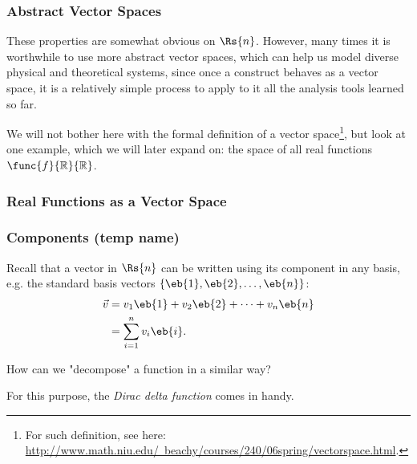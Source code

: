 \begin{frame}
	\frametitle{Abstract Vector Spaces}
	These properties are somewhat obvious on $\Rs{n}$. However, many times it is worthwhile to use more abstract vector spaces, which can help us model diverse physical and theoretical systems, since once a construct behaves as a vector space, it is a relatively simple process to apply to it all the analysis tools learned so far.

	We will not bother here with the formal definition of a vector space\footnote{For such definition, see here: \href{http://www.math.niu.edu/~beachy/courses/240/06spring/vectorspace.html}{http://www.math.niu.edu/~beachy/courses/240/06spring/vectorspace.html}.}, but look at one example, which we will later expand on: the space of all real functions $\func{f}{\mathbb{R}}{\mathbb{R}}$.
\end{frame}

\begin{frame}
	\frametitle{Real Functions as a Vector Space}
	\begin{itemize}
	\end{itemize}
\end{frame}


\begin{frame}
	\frametitle{Components (temp name)}
	Recall that a vector in $\Rs{n}$ can be written using its component in any basis, e.g. the standard basis vectors $\left\{ \eb{1},\eb{2},\dots,\eb{n} \right\}$:
	\begin{align*}
		\vec{v} &= v_{1}\eb{1} + v_{2}\eb{2} + \cdots + v_{n}\eb{n}\\
		&= \sum\limits_{i=1}^{n}v_{i}\eb{i}.
	\end{align*}

	How can we "decompose" a function in a similar way?

	For this purpose, the \emph{Dirac delta function} comes in handy.
\end{frame}

